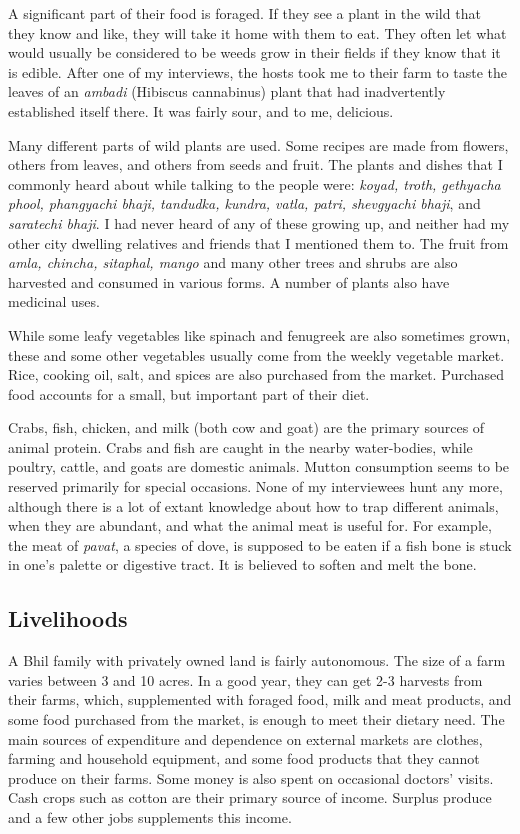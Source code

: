 \documentclass[report.tex]{subfiles}
\begin{document}
A significant part of their food is foraged. If they see a plant in the wild that they know and like, they will take it home with them to eat. They often let what would usually be considered to be weeds grow in their fields if they know that it is edible. After one of my interviews, the hosts took me to their farm to taste the leaves of an \textit{ambadi} (Hibiscus cannabinus) plant that had inadvertently established itself there. It was fairly sour, and to me, delicious.

Many different parts of wild plants are used. Some recipes are made from flowers, others from leaves, and others from seeds and fruit. The plants and dishes that I commonly heard about while talking to the people were: \textit{koyad, troth, gethyacha phool, phangyachi bhaji, tandudka, kundra, vatla, patri, shevgyachi bhaji}, and \textit{saratechi bhaji}. I had never heard of any of these growing up, and neither had my other city dwelling relatives and friends that I mentioned them to. The fruit from \textit{amla, chincha, sitaphal, mango} and many other trees and shrubs are also harvested and consumed in various forms. A number of plants also have medicinal uses.

While some leafy vegetables like spinach and fenugreek are also sometimes grown, these and some other vegetables usually come from the weekly vegetable market. Rice, cooking oil, salt, and spices are also purchased from the market. Purchased food accounts for a small, but important part of their diet.

Crabs, fish, chicken, and milk (both cow and goat) are the primary sources of animal protein. Crabs and fish are caught in the nearby water-bodies, while poultry, cattle, and goats are domestic animals. Mutton consumption seems to be reserved primarily for special occasions. None of my interviewees hunt any more, although there is a lot of extant knowledge about how to trap different animals, when they are abundant, and what the animal meat is useful for. For example, the meat of \textit{pavat}, a species of dove, is supposed to be eaten if a fish bone is stuck in one's palette or digestive tract. It is believed to soften and melt the bone.

\subsection{Livelihoods}\label{subsec:livelihood}

A Bhil family with privately owned land is fairly autonomous. The size of a farm varies between 3 and 10 acres. In a good year, they can get 2-3 harvests from their farms, which, supplemented with foraged food, milk and meat products, and some food purchased from the market, is enough to meet their dietary need. The main sources of expenditure and dependence on external markets are clothes, farming and household equipment, and some food products that they cannot produce on their farms. Some money is also spent on occasional doctors' visits. Cash crops such as cotton are their primary source of income. Surplus produce and a few other jobs supplements this income.
\end{document}
